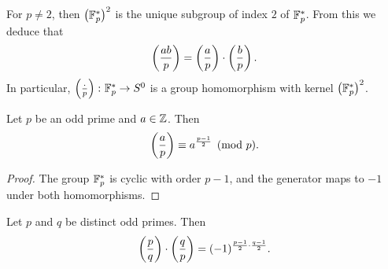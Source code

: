 \begin{opomba}
For $p \ne 2$, then $\left(\mathbb{F}_p^*\right)^2$ is the unique subgroup of index
$2$ of $\mathbb{F}_p^*$. From this we deduce that
\[
\left(\frac{ab}{p}\right) = \left(\frac{a}{p}\right) \cdot \left(\frac{b}{p}\right).
\]
In particular, $\left(\frac{\cdot}{p}\right) \colon \mathbb{F}_p^* \to S^0$ is a
group homomorphism with kernel $\left(\mathbb{F}_p^*\right)^2$.
\end{opomba}

\begin{lema}
Let $p$ be an odd prime and $a \in \mathbb{Z}$. Then
\[
\left(\frac{a}{p}\right) \equiv a^{\frac{p-1}{2}} \pmod{p}.
\]
\end{lema}

\begin{proof}
The group $\mathbb{F}_p^*$ is cyclic with order $p-1$, and the generator
maps to $-1$ under both homomorphisms.
\end{proof}

\begin{izrek}
Let $p$ and $q$ be distinct odd primes. Then
\[
\left(\frac{p}{q}\right) \cdot \left(\frac{q}{p}\right) =
(-1)^{\frac{p-1}{2} \cdot \frac{q-1}{2}}.
\]
\end{izrek}

